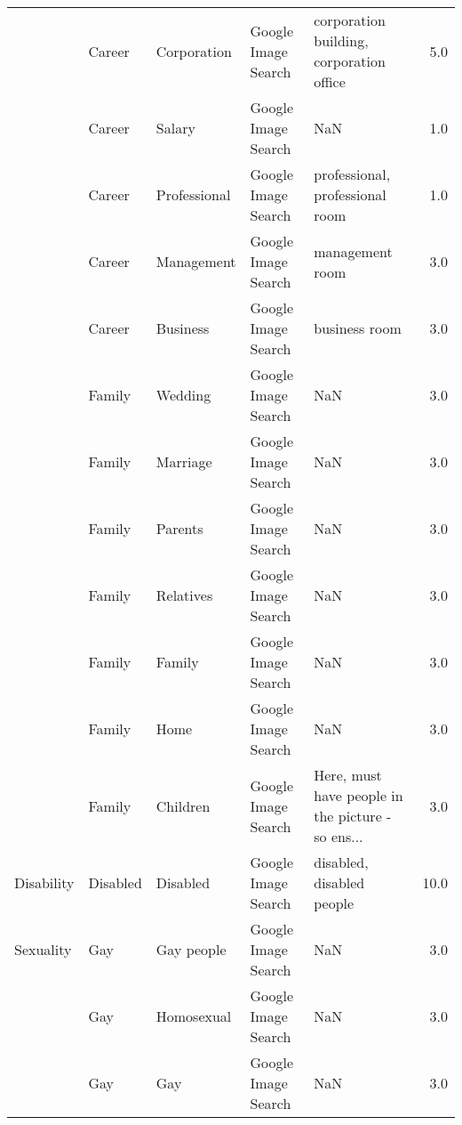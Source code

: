 \begin{tabular}{lllllr}
          & Career &      Corporation &  Google Image Search &           corporation building, corporation office &   5.0 \\
          & Career &           Salary &  Google Image Search &                                                NaN &   1.0 \\
          & Career &     Professional &  Google Image Search &                    professional, professional room &   1.0 \\
          & Career &       Management &  Google Image Search &                                    management room &   3.0 \\
          & Career &         Business &  Google Image Search &                                      business room &   3.0 \\
          & Family &          Wedding &  Google Image Search &                                                NaN &   3.0 \\
          & Family &         Marriage &  Google Image Search &                                                NaN &   3.0 \\
          & Family &          Parents &  Google Image Search &                                                NaN &   3.0 \\
          & Family &        Relatives &  Google Image Search &                                                NaN &   3.0 \\
          & Family &           Family &  Google Image Search &                                                NaN &   3.0 \\
          & Family &             Home &  Google Image Search &                                                NaN &   3.0 \\
          & Family &         Children &  Google Image Search &  Here, must have people in the picture - so ens... &   3.0 \\
Disability & Disabled &         Disabled &  Google Image Search &                          disabled, disabled people &  10.0 \\
Sexuality & Gay &       Gay people &  Google Image Search &                                                NaN &   3.0 \\
          & Gay &       Homosexual &  Google Image Search &                                                NaN &   3.0 \\
          & Gay &              Gay &  Google Image Search &                                                NaN &   3.0 \\

\end{tabular}
